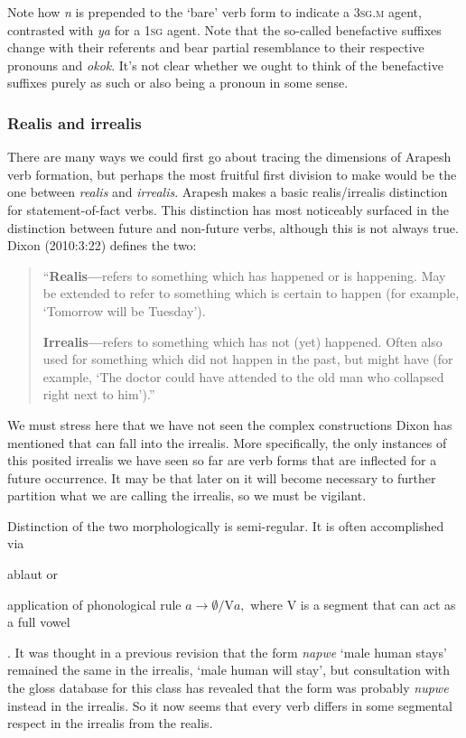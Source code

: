 \documentclass[pdftex,12pt,letterpaper]{article}
\let\ipa\textipa
\def\sw{\ipa{\super w}}
\begin{document}
 \noindent Note how \emph{n\ipa{@}} is prepended to the `bare' verb form to indicate a \textsc{3sg.m} agent, contrasted with \emph{ya} for a \textsc{1sg} agent. Note that the so-called benefactive suffixes change with their referents and bear partial resemblance to their respective pronouns \emph{\ipa{@p@}} and \emph{ok\sw ok\sw}. It's not clear whether we ought to think of the benefactive suffixes purely as such or also being a pronoun in some sense.

 \subsubsection{Realis and irrealis}

 There are many ways we could first go about tracing the dimensions of Arapesh verb formation, but perhaps the most fruitful first division to make would be the one between \emph{realis} and \emph{irrealis}. Arapesh makes a basic realis/irrealis distinction for statement-of-fact verbs. This distinction has most noticeably surfaced in the distinction between future and non-future verbs, although this is not always true. Dixon (2010:3:22) defines the two: 
 
 \singlespacing\begin{quote}
 ``\textbf{Realis---}refers to something which has happened or is happening. May be extended to refer to something which is certain to happen (for example, `Tomorrow will be Tuesday').
 
 \textbf{Irrealis---}refers to something which has not (yet) happened. Often also used for something which did not happen in the past, but might have (for example, ‘The doctor could have attended to the old man who collapsed right next to him’).''
 \end{quote} \doublespacing
 
 \noindent We must stress here that we have not seen the complex constructions Dixon has mentioned that can fall into the irrealis. More specifically, the only instances of this posited irrealis we have seen so far are verb forms that are inflected for a future occurrence. It may be that later on it will become necessary to further partition what we are calling the irrealis, so we must be vigilant. 
 
 Distinction of the two morphologically is semi-regular. It is often accomplished via \begin{inparaenum}[(a)] \item ablaut or \item application of phonological rule $a \rightarrow \emptyset / \text{V}a,$ where V is a segment that can act as a full vowel\end{inparaenum}. It was thought in a previous revision that the form \emph{napwe} `male human stays' remained the same in the irrealis, `male human will stay', but consultation with the gloss database for this class has revealed that the form was probably \emph{nupwe} instead in the irrealis. So it now seems that every verb differs in some segmental respect in the irrealis from the realis.
\end{document}
